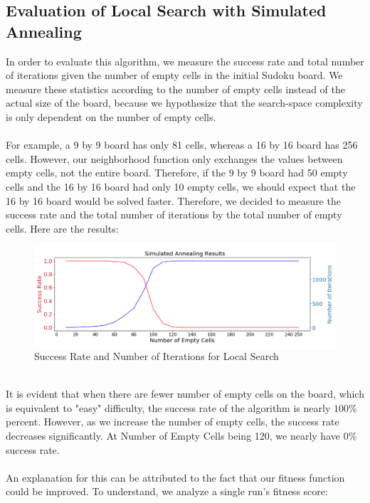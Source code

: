 \documentclass[12pt, a4paper]{article}
\begin{document}
		\subsection{Evaluation of Local Search with Simulated Annealing}
			In order to evaluate this algorithm, we measure the success rate and total number of iterations given the number of empty cells in the initial Sudoku board. We measure these statistics according to the number of empty cells instead of the actual size of the board, because we hypothesize that the search-space complexity is only dependent on the number of empty cells.\\\\
			For example, a 9 by 9 board has only 81 cells, whereas a 16 by 16 board has 256 cells. However, our neighborhood function only exchanges the values between empty cells, not the entire board. Therefore, if the 9 by 9 board had 50 empty cells and the 16 by 16 board had only 10 empty cells, we should expect that the 16 by 16 board would be solved faster. Therefore, we decided to measure the success rate and the total number of iterations by the total number of empty cells. Here are the results:\\
			\begin{figure}[h]
			\begin{center} 
				\includegraphics[width=7in]{simulated_annealing_results.png}
				\caption{Success Rate and Number of Iterations for Local Search} 
			\end{center} 
			\end{figure}\\
			It is evident that when there are fewer number of empty cells on the board, which is equivalent to "easy" difficulty, the success rate of the algorithm is nearly $100$\% percent. However, as we increase the number of empty cells, the success rate decreases significantly. At Number of Empty Cells being 120, we nearly have $0\%$ success rate.\\\\
			An explanation for this can be attributed to the fact that our fitness function could be improved. To understand, we analyze a single run's fitness score:\\
\end{document}
